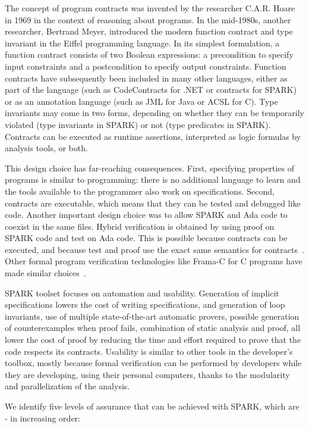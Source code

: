 \documentclass{llncs}
\begin{document}
The concept of program contracts was invented by the researcher C.A.R. Hoare in
1969 in the context of reasoning about programs. In the mid-1980s, another
researcher, Bertrand Meyer, introduced the modern function contract and type
invariant in the Eiffel programming language.  In its simplest formulation, a
function contract consists of two Boolean expressions: a precondition to
specify input constraints and a postcondition to specify output constraints.
Function contracts have subsequently been included in many other languages,
either as part of the language (such as CodeContracts for .NET or contracts for
SPARK) or as an annotation language (such as JML for Java or ACSL for C). Type
invariants may come in two forms, depending on whether they can be temporarily
violated (type invariants in SPARK) or not (type predicates in
SPARK). Contracts can be executed as runtime assertions, interpreted as logic
formulas by analysis tools, or both.

This design choice has far-reaching consequences. First, specifying properties
of programs is similar to programming: there is no additional language to learn
and the tools available to the programmer also work on specifications. Second,
contracts are executable, which means that they can be tested and debugged like
code. Another important design choice was to allow SPARK and Ada code to
coexist in the same files. Hybrid verification is obtained by using proof on
SPARK code and test on Ada code. This is possible because contracts can be
executed, and because test and proof use the exact same semantics for
contracts~\cite{tseChalin10}. Other formal program verification technologies
like Frama-C for C programs have made similar
choices~\cite{kosmatov:hal-01344110}.

SPARK toolset focuses on automation and usability. Generation of implicit
specifications lowers the cost of writing specifications, and generation of
loop invariants, use of multiple state-of-the-art automatic provers, possible
generation of counterexamples when proof fails, combination of static analysis
and proof, all lower the cost of proof by reducing the time and effort required
to prove that the code respects its contracts. Usability is similar to other
tools in the developer’s toolbox, mostly because formal verification can be
performed by developers while they are developing, using their personal
computers, thanks to the modularity and parallelization of the analysis.

We identify five levels of assurance that can be achieved with SPARK, which are
- in increasing order:
\end{document}
